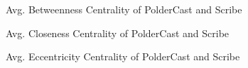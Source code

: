 \begin{figure}[H]
    \centering
    
    \caption{Avg. Betweenness Centrality of PolderCast and Scribe}
    \label{fig:eval_betweenness}
\end{figure}




\begin{figure}[H]
    \centering
    
    \caption{Avg. Closeness Centrality of PolderCast and Scribe}
    \label{fig:eval_closeness}
\end{figure}

\begin{figure}[H]
    \centering
    
    \caption{Avg. Eccentricity Centrality of PolderCast and Scribe}
    \label{fig:eval_eccentricity}
\end{figure}

